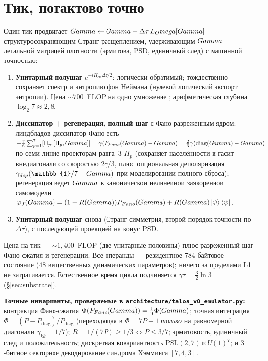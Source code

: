 \section{Тик, потактово точно}
\label{app:tick}

Один тик \TALOS{} продвигает $Gamma\leftarrow Gamma+\Delta\tau\,L_Omega[Gamma]$
структуросохраняющим Странг-расщеплением, удерживающим $Gamma$ легальной матрицей
плотности (эрмитова, PSD, единичный след) с машинной точностью:
\begin{enumerate}[leftmargin=1.6em,itemsep=1pt]
  \item \textbf{Унитарный полушаг} $e^{-i H_{\mathrm{eff}}\Delta\tau/2}$:
        логически обратимый; тождественно сохраняет спектр и энтропию фон
        Неймана (нулевой логический экспорт энтропии). Цена $\sim\!700$~FLOP на
        одно умножение \DM{}; арифметическая глубина $\log_2 7\approx 2{,}8$.
  \item \textbf{Диссипатор + регенерация, полный шаг} с Фано-разреженным ядром:
        линдбладов диссипатор Фано есть
        $-\tfrac{\gamma}{6}\sum_{p=1}^7[\Pi_p,[\Pi_p,Gamma]]
        = \gamma(P_{Fano}(Gamma)-Gamma)
        = \tfrac{2}{3}\gamma(\operatorname{diag}(Gamma)-Gamma)$ по семи
        линие-проекторам ранга~$3$ $\Pi_p$ (сохраняет населённости и гасит
        внедиагонали со скоростью $2\gamma/3$, плюс опциональная деполяризация
        $\gamma_{\mathrm{dep}}(\mathbb{1}/7-\Gam)$ при моделировании полного
        сброса); регенерация ведёт $Gamma$ к канонической нелинейной заякоренной
        самомодели $\varphi_J(Gamma)=(1-R(Gamma))P_{Fano}(Gamma)
        + R(Gamma)\ket{\psi}\bra{\psi}$.
  \item \textbf{Унитарный полушаг} снова (Странг-симметрия, второй порядок
        точности по $\Delta\tau$), с последующей проекцией на конус PSD.
\end{enumerate}
Цена на тик --- $\sim\!1{,}400$~FLOP (две унитарные половины) плюс разреженный
шаг Фано-сжатия и регенерации. Все операнды --- резидентное $784$-байтовое
состояние ($48$ вещественных динамических параметров); ничего за пределами L1 не
затрагивается. Естественное время цикла подчиняется
$\bar\gamma\tau=\tfrac32\ln3$ (\S\ref{sec:substrate}).

\noindent\textbf{Точные инварианты, проверяемые в
\texttt{architecture/talos\_v0\_emulator.py}:} контракция Фано-сжатия
$\Phi(P_{Fano}(Gamma))=\tfrac19\Phi(Gamma)$; точная интеграция
$\Phi=(P-P_{\mathrm{diag}})/P_{\mathrm{diag}}$ (переходящая в $\Phi=7P-1$
\emph{только} на равномерной диагонали $\gamma_{kk}=1/7$);
$R=1/(7P)\ge 1/3\Leftrightarrow P\le 3/7$; эрмитовость, единичный след и
положительность; дискретная ковариантность $\mathrm{PSL}(2,7)\ltimes U(1)^7$; и
$3$-битное секторное декодирование синдрома Хэмминга $[7,4,3]$.
